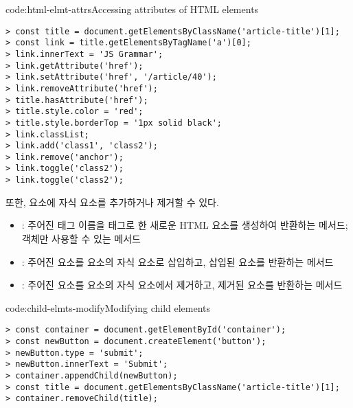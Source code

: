 \begin{code}{code:html-elmt-attrs}{Accessing attributes of HTML elements}
\begin{verbatim}
> const title = document.getElementsByClassName('article-title')[1];
> const link = title.getElementsByTagName('a')[0];
> link.innerText = 'JS Grammar';
> link.getAttribute('href');
> link.setAttribute('href', '/article/40');
> link.removeAttribute('href');
> title.hasAttribute('href');
> title.style.color = 'red';
> title.style.borderTop = '1px solid black';
> link.classList;
> link.add('class1', 'class2');
> link.remove('anchor');
> link.toggle('class2');
> link.toggle('class2');
\end{verbatim}
\end{code}

또한, 요소에 자식 요소를 추가하거나 제거할 수 있다.

\begin{itemize}
    \item {}: 주어진 태그 이름을 태그로 한 새로운 HTML 요소를 생성하여 반환하는 메서드;  객체만 사용할 수 있는 메서드
    \item {}: 주어진 요소를 요소의 자식 요소로 삽입하고, 삽입된 요소를 반환하는 메서드
    \item {}: 주어진 요소를 요소의 자식 요소에서 제거하고, 제거된 요소를 반환하는 메서드
\end{itemize}

\begin{code}{code:child-elmts-modify}{Modifying child elements}
\begin{verbatim}
> const container = document.getElementById('container');
> const newButton = document.createElement('button');
> newButton.type = 'submit';
> newButton.innerText = 'Submit';
> container.appendChild(newButton);
> const title = document.getElementsByClassName('article-title')[1];
> container.removeChild(title);
\end{verbatim}
\end{code}
